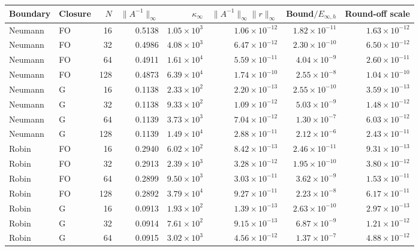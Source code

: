 \begin{table}[htbp]
\centering
\scriptsize
\setlength{\tabcolsep}{4pt}
\begin{tabular}{llrrrrrr}
\toprule
Boundary & Closure & $N$ & $\|A^{-1}\|_\infty$ & $\kappa_\infty$ & $\|A^{-1}\|_\infty\|r\|_\infty$ & Bound$/E_{\infty,h}$ & Round-off scale \\
\midrule
Neumann & FO & 16 & 0.5138 & $1.05\times10^{3}$ & $1.06\times10^{-12}$ & $1.82\times10^{-11}$ & $1.63\times10^{-12}$ \\
Neumann & FO & 32 & 0.4986 & $4.08\times10^{3}$ & $6.47\times10^{-12}$ & $2.30\times10^{-10}$ & $6.50\times10^{-12}$ \\
Neumann & FO & 64 & 0.4911 & $1.61\times10^{4}$ & $5.59\times10^{-11}$ & $4.04\times10^{-9}$ & $2.60\times10^{-11}$ \\
Neumann & FO & 128 & 0.4873 & $6.39\times10^{4}$ & $1.74\times10^{-10}$ & $2.55\times10^{-8}$ & $1.04\times10^{-10}$ \\
Neumann & G & 16 & 0.1138 & $2.33\times10^{2}$ & $2.20\times10^{-13}$ & $2.55\times10^{-10}$ & $3.59\times10^{-13}$ \\
Neumann & G & 32 & 0.1138 & $9.33\times10^{2}$ & $1.09\times10^{-12}$ & $5.03\times10^{-9}$ & $1.48\times10^{-12}$ \\
Neumann & G & 64 & 0.1139 & $3.73\times10^{3}$ & $7.04\times10^{-12}$ & $1.30\times10^{-7}$ & $6.03\times10^{-12}$ \\
Neumann & G & 128 & 0.1139 & $1.49\times10^{4}$ & $2.88\times10^{-11}$ & $2.12\times10^{-6}$ & $2.43\times10^{-11}$ \\
Robin & FO & 16 & 0.2940 & $6.02\times10^{2}$ & $8.42\times10^{-13}$ & $2.46\times10^{-11}$ & $9.31\times10^{-13}$ \\
Robin & FO & 32 & 0.2913 & $2.39\times10^{3}$ & $3.28\times10^{-12}$ & $1.95\times10^{-10}$ & $3.80\times10^{-12}$ \\
Robin & FO & 64 & 0.2899 & $9.50\times10^{3}$ & $3.03\times10^{-11}$ & $3.62\times10^{-9}$ & $1.53\times10^{-11}$ \\
Robin & FO & 128 & 0.2892 & $3.79\times10^{4}$ & $9.27\times10^{-11}$ & $2.23\times10^{-8}$ & $6.17\times10^{-11}$ \\
Robin & G & 16 & 0.0913 & $1.93\times10^{2}$ & $1.39\times10^{-13}$ & $2.63\times10^{-10}$ & $2.97\times10^{-13}$ \\
Robin & G & 32 & 0.0914 & $7.61\times10^{2}$ & $9.15\times10^{-13}$ & $6.87\times10^{-9}$ & $1.21\times10^{-12}$ \\
Robin & G & 64 & 0.0915 & $3.02\times10^{3}$ & $4.56\times10^{-12}$ & $1.37\times10^{-7}$ & $4.88\times10^{-12}$ \\

\end{tabular}
\end{table}
